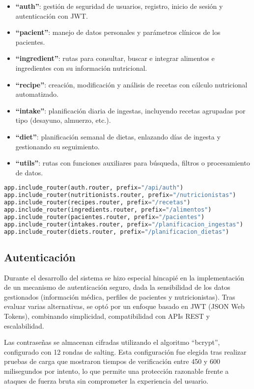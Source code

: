 \begin{itemize}
    \item \textbf{``auth''}: gestión de seguridad de usuarios, registro, inicio de sesión y autenticación con JWT.
    \item \textbf{``pacient''}: manejo de datos personales y parámetros clínicos de los pacientes.
    \item \textbf{``ingredient''}: rutas para consultar, buscar e integrar alimentos e ingredientes con su información nutricional.
    \item \textbf{``recipe''}: creación, modificación y análisis de recetas con cálculo nutricional automatizado.
    \item \textbf{``intake''}: planificación diaria de ingestas, incluyendo recetas agrupadas por tipo (desayuno, almuerzo, etc.).
    \item \textbf{``diet''}: planificación semanal de dietas, enlazando días de ingesta y gestionando su seguimiento.
    \item \textbf{``utils''}: rutas con funciones auxiliares para búsqueda, filtros o procesamiento de datos.
\end{itemize}
\begin{lstlisting}[language=Python, caption={Registro de routers en main.py}]
app.include_router(auth.router, prefix="/api/auth")
app.include_router(nutritionists.router, prefix="/nutricionistas")
app.include_router(recipes.router, prefix="/recetas")
app.include_router(ingredients.router, prefix="/alimentos")
app.include_router(pacientes.router, prefix="/pacientes")
app.include_router(intakes.router, prefix="/planificacion_ingestas")
app.include_router(diets.router, prefix="/planificacion_dietas")
\end{lstlisting}

\subsection{Autenticación}
Durante el desarrollo del sistema se hizo especial hincapié en la implementación de un mecanismo de autenticación seguro, dada la sensibilidad de los datos gestionados (información médica, perfiles de pacientes y nutricionistas). Tras evaluar varias alternativas, se optó por un enfoque basado en JWT (JSON Web Tokens)\cite{JWT}, combinando simplicidad, compatibilidad con APIs REST y escalabilidad.

Las contraseñas se almacenan cifradas utilizando el algoritmo ``bcrypt''\cite{bcrypt}, configurado con 12 rondas de salting. Esta configuración fue elegida tras realizar pruebas de carga que mostraron tiempos de verificación entre 450 y 600 milisegundos por intento, lo que permite una protección razonable frente a ataques de fuerza bruta sin comprometer la experiencia del usuario.

